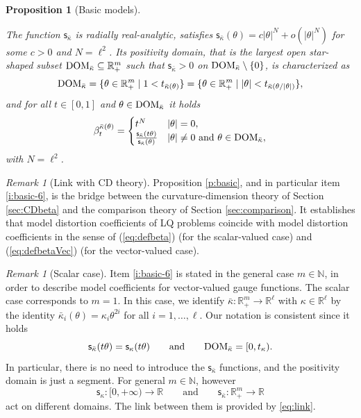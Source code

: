 \documentclass[11pt,a4paper]{article}
\theoremstyle{plain}
\newtheorem{proposition}[theorem]{Proposition}
\theoremstyle{definition}
\theoremstyle{remark}
\newtheorem{remark}[theorem]{Remark}
\numberwithin{equation}{section}
\newcommand{\R}{\mathbb{R}} %
\newcommand{\N}{\mathbb{N}} %
\newcommand{\DOM}{{\rm{DOM}}}
\newcommand{\sfs}{\mathsf{s}}
\begin{document}
\begin{proposition}[Basic models]
\begin{enumerate}[(i)]
The function $\sfs_{\bar\kappa}$ is radially real-analytic, satisfies $\sfs_{\bar{\kappa}}(\theta) = c|\theta|^N + o(|\theta|^N)$ for some $c>0$ and $N=\ell^2$. Its positivity domain, that is the largest open star-shaped subset $\DOM_{\bar{\kappa}}\subseteq \R^m_+$ such that $\sfs_{\bar{\kappa}}>0$ on $\DOM_{\bar{\kappa}}\setminus \{0\}$, is characterized as
\begin{equation}
\DOM_{\bar{\kappa}} = \{ \theta\in \R^m_+ \mid 1 < t_{\bar{\kappa}(\theta)} \} = \{\theta \in \R^m_+ \mid |\theta| < t_{\bar{\kappa}(\theta/|\theta|)}\},
\end{equation}
and for all $t\in [0,1]$ and $\theta \in \DOM_{\bar{\kappa}}$ it holds
\begin{equation}
\beta_t^{\bar{\kappa}(\theta)} = \begin{cases}
t^N & |\theta|=0, \\
\frac{\sfs_{\bar{\kappa}}(t\theta)}{\sfs_{\bar{\kappa}}(\theta)} & |\theta|\neq 0 \text{ and } \theta \in \DOM_{\bar{\kappa}},
\end{cases}
\end{equation}
with $N=\ell^2$.
\end{enumerate}
\end{proposition}
\begin{remark}[Link with CD theory]\label{r:link} 
Proposition \ref{p:basic}, and in particular item \ref{i:basic-6}, is the bridge between the curvature-dimension theory of Section \ref{sec:CDbeta} and the comparison theory of Section \ref{sec:comparison}. It establishes that model distortion coefficients of LQ problems coincide with model distortion coefficients in the sense of (\ref{eq:defbeta}) (for the scalar-valued case) and (\ref{eq:defbetaVec}) (for the vector-valued case).
\end{remark}
\begin{remark}[Scalar case]\label{rmk:identify}
Item \ref{i:basic-6} is stated in the general case $m\in \N$, in order to describe model coefficients for vector-valued gauge functions. The scalar case corresponds to $m=1$. In this case, we identify $\bar\kappa: \R^m_+\to \R^\ell$ with $\kappa\in \R^\ell$ by the identity $\bar{\kappa}_i(\theta) = \kappa_i \theta^{2i}$ for all $i=1,\dots,\ell$. Our notation is consistent since it holds
\begin{equation}
\sfs_{\bar{\kappa}}(t\theta) = \sfs_\kappa(t\theta) \qquad \text{and} \qquad \DOM_{\bar{\kappa}} = [0,t_{\kappa}).
\end{equation}
In particular, there is no need to introduce the $\sfs_{\bar\kappa}$ functions, and the positivity domain is just a segment. For general $m\in \N$, however
\begin{equation}
\sfs_\kappa :[0,+\infty) \to \R\qquad\text{and}\qquad \sfs_{\bar{\kappa}} : \R^m_+\to \R
\end{equation}
act on different domains. The link between them is provided by \eqref{eq:link}.
\end{remark}
\end{document}
